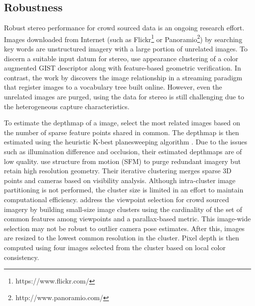 %

\subsection{Robustness}
Robust stereo performance for crowd sourced data is an ongoing research effort.
Images downloaded from Internet (such as Flickr\footnote{https://www.flickr.com/} or Panoramio\footnote{http://www.panoramio.com/}) by searching key words are unstructured imagery with a large portion of unrelated images. To discern a suitable input datum for stereo, \citet{Frahm2010} use appearance clustering of a color augmented GIST descriptor \cite{oliva2001modeling} along with feature-based geometric verification. In contrast, the work by \citet{Heinly} discovers the image relationship in a streaming paradigm that register images to a vocabulary tree built online. However, even the unrelated images are purged, using the data for stereo is still challenging due to the heterogeneous capture characteristics.

To estimate the depthmap of a image, \citet{Frahm2010} select the most related images based on the number of sparse feature points shared in common. The depthmap is then estimated using the heuristic K-best planesweeping algorithm  \cite{handle_occlusion2001}. Due to the issues such as illumination difference and occlusion, their estimated depthmaps are of low quality. 
\citet{InternetScaleMVS_CVPR2010} use structure from motion (SFM) to purge redundant imagery but retain high resolution geometry. Their iterative clustering merges sparse 3D points and cameras based on visibility analysis. Although intra-cluster image partitioning is not performed, the cluster size is limited in an effort to maintain computational efficiency. \citet{Goesele07} address the viewpoint selection for crowd sourced imagery by building small-size image clusters using the cardinality of the set of common features among viewpoints and a parallax-based metric. This image-wide selection may not be robust to outlier camera pose estimates. After this, images are resized to the lowest common resolution in the cluster. Pixel depth is then computed using four images selected from the cluster based on local color consistency.

